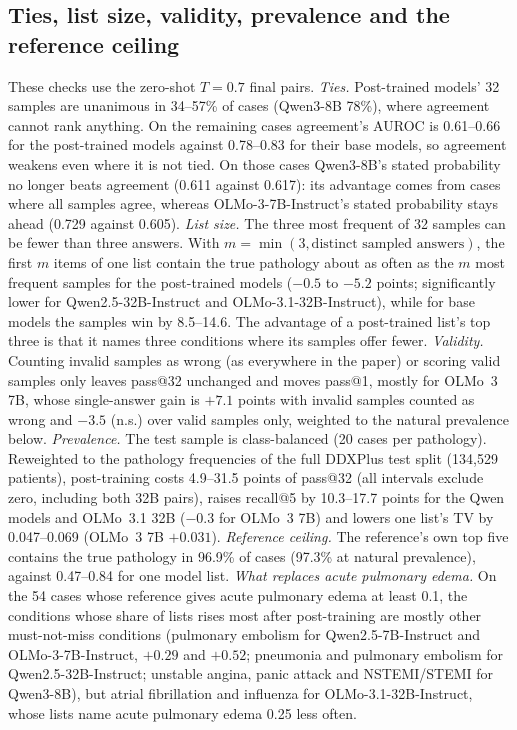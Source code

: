 \documentclass[11pt]{article}
\begin{document}
\subsection{Ties, list size, validity, prevalence and the reference ceiling}\label{sec:further}
These checks use the zero-shot $T{=}0.7$ final pairs.
\emph{Ties.} Post-trained models' 32 samples are unanimous in 34--57\% of cases (Qwen3-8B 78\%), where agreement cannot rank anything. On the remaining cases agreement's AUROC is 0.61--0.66 for the post-trained models against 0.78--0.83 for their base models, so agreement weakens even where it is not tied. On those cases Qwen3-8B's stated probability no longer beats agreement (0.611 against 0.617): its advantage comes from cases where all samples agree, whereas OLMo-3-7B-Instruct's stated probability stays ahead (0.729 against 0.605).
\emph{List size.} The three most frequent of 32 samples can be fewer than three answers. With $m = \min(3, \text{distinct sampled answers})$, the first $m$ items of one list contain the true pathology about as often as the $m$ most frequent samples for the post-trained models ($-0.5$ to $-5.2$ points; significantly lower for Qwen2.5-32B-Instruct and OLMo-3.1-32B-Instruct), while for base models the samples win by 8.5--14.6. The advantage of a post-trained list's top three is that it names three conditions where its samples offer fewer.
\emph{Validity.} Counting invalid samples as wrong (as everywhere in the paper) or scoring valid samples only leaves pass@32 unchanged and moves pass@1, mostly for OLMo~3 7B, whose single-answer gain is $+7.1$ points with invalid samples counted as wrong and $-3.5$ (n.s.) over valid samples only, weighted to the natural prevalence below.
\emph{Prevalence.} The test sample is class-balanced (20 cases per pathology). Reweighted to the pathology frequencies of the full DDXPlus test split (134,529 patients), post-training costs 4.9--31.5 points of pass@32 (all intervals exclude zero, including both 32B pairs), raises recall@5 by 10.3--17.7 points for the Qwen models and OLMo~3.1 32B ($-0.3$ for OLMo~3 7B) and lowers one list's TV by 0.047--0.069 (OLMo~3 7B $+0.031$).
\emph{Reference ceiling.} The reference's own top five contains the true pathology in 96.9\% of cases (97.3\% at natural prevalence), against 0.47--0.84 for one model list.
\emph{What replaces acute pulmonary edema.} On the 54 cases whose reference gives acute pulmonary edema at least 0.1, the conditions whose share of lists rises most after post-training are mostly other must-not-miss conditions (pulmonary embolism for Qwen2.5-7B-Instruct and OLMo-3-7B-Instruct, $+0.29$ and $+0.52$; pneumonia and pulmonary embolism for Qwen2.5-32B-Instruct; unstable angina, panic attack and NSTEMI/STEMI for Qwen3-8B), but atrial fibrillation and influenza for OLMo-3.1-32B-Instruct, whose lists name acute pulmonary edema 0.25 less often.
\end{document}
